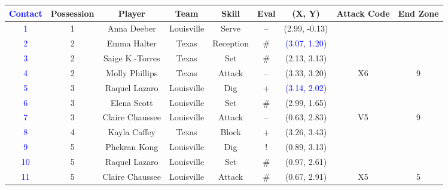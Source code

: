 \begin{tabular}{ccccccccc}
  \textcolor{blue}{Contact} & Possession & Player          & Team     & Skill                 & Eval     & (X, Y)                  & Attack Code  & End Zone\\
  \hline
  \textcolor{blue}{1} & 1            & Anna Deeber         & Louisville &  Serve         &  --    &  (2.99, -0.13) \\
  \hdashline
  \textcolor{blue}{2} & 2            & Emma Halter         & Texas &  Reception     &  \# &  \textcolor{blue}{(3.07, 1.20)} \\
  \textcolor{blue}{3} & 2            & Saige K.-Torres     & Texas &  Set           &  \# &  (2.13, 3.13) \\
  \textcolor{blue}{4} & 2            & Molly Phillips      & Texas &  Attack        &  -- &  (3.33, 3.20) &  X6             & 9\\
  \hdashline
  \textcolor{blue}{5} & 3            & Raquel Lazaro       & Louisville &  Dig           &  +     &  \textcolor{blue}{(3.14, 2.02)} \\
  \textcolor{blue}{6} & 3            & Elena Scott         & Louisville &  Set           &  \#    &  (2.99, 1.65) \\
  \textcolor{blue}{7} & 3            & Claire Chaussee     & Louisville &  Attack        &  --    &  (0.63, 2.83)    &  V5  & 9\\
  \hdashline
  \textcolor{blue}{8} & 4            & Kayla Caffey        & Texas &  Block         &  +  &  (3.26, 3.43) \\
  \hdashline
  \textcolor{blue}{9} & 5            & Phekran Kong        & Louisville &  Dig           &  !     &  (0.89, 3.13) \\
  \textcolor{blue}{10} & 5            & Raquel Lazaro       & Louisville &  Set           &  \#    &  (0.97, 2.61) \\
  \textcolor{blue}{11} & 5            & Claire Chaussee     & Louisville &  Attack        &  \#    &  (0.67, 2.91)    &  X5 & 5\\
\end{tabular}